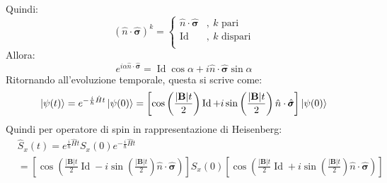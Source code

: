 \documentclass[11pt, a4paper]{scrartcl} %
\numberwithin{equation}{subsection}
\theoremstyle{style2}
\theoremstyle{style1}
\begin{document}
Quindi:
\begin{equation}
	(\hat{n}\cdot \hat{\pmb{\sigma } }) ^k = \begin{cases}
		\hat{n}\cdot \hat{\pmb{\sigma } } & , \ k \text{ pari}\\
		\operatorname{Id}  & , \ k \text{ dispari}\\
	\end{cases}
\end{equation}
Allora:
\begin{equation}
	e^{i \alpha  \hat{n}\cdot \hat{\pmb{\sigma } }} = \operatorname{Id}  \cos \alpha  + i \hat{n}\cdot \hat{\pmb{\sigma } } \sin \alpha 
\end{equation}
Ritornando all'evoluzione temporale, questa si scrive come:
\begin{equation}
	\ket{\psi (t)}= e^{ - \frac{i}{\hbar } \hat{H }t }  \ket{\psi (0)} = \left[ \cos \left(\frac{\lvert \mathbf{B}  \rvert t}{2}\right) \operatorname{Id}  + i \sin\left(\frac{\lvert \mathbf{B}  \rvert t}{2}\right) \hat{n}\cdot \hat{\pmb{\sigma } } \right] \ket{\psi (0)} 
\end{equation}
Quindi per operatore di spin in rappresentazione di Heisenberg:
\begin{equation*}
	\begin{split}
		&\hat{S}_x(t) = e^{ \frac{i}{\hbar }\hat{H}t} S_x(0) e^{ - \frac{i}{\hbar }\hat{H}t} \\
			     &= \left[ \cos \left(\frac{\lvert \mathbf{B}  \rvert t}{2} \operatorname{Id} - i \sin \left(\frac{\lvert \mathbf{B}  \rvert t}{2}\right) \hat{n}\cdot \hat{\pmb{\sigma } }\right)  \right] S_x(0)\left[ \cos \left(\frac{\lvert \mathbf{B}  \rvert t}{2} \operatorname{Id} + i \sin \left(\frac{\lvert \mathbf{B}  \rvert t}{2}\right) \hat{n}\cdot \hat{\pmb{\sigma } }\right)  \right]
	\end{split}
\end{equation*}
\end{document}
